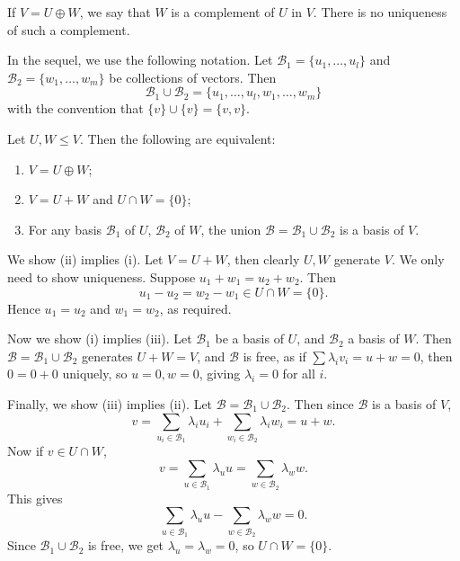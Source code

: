 \documentclass[12pt]{article}
\begin{document}
\begin{remark}
	If $V = U \oplus W$, we say that $W$ is a complement of $U$ in $V$. There is no uniqueness of such a complement.
\end{remark}

In the sequel, we use the following notation. Let $\mathcal{B}_1 = \{u_1, \ldots, u_l\}$ and $\mathcal{B}_2 = \{w_1, \ldots, w_m\}$ be collections of vectors. Then
\[
	\mathcal{B}_1 \cup \mathcal{B}_2 = \{u_1, \ldots, u_l, w_1, \ldots, w_m\}
\]
with the convention that $\{v\} \cup \{v\} = \{v, v\}$.

\begin{lemma}
	Let $U, W \leq V$. Then the following are equivalent:
	\begin{enumerate}[\normalfont(i)]
		\item $V = U \oplus W$;
		\item $V = U + W$ and $U \cap W = \{0\}$;
		\item For any basis $\mathcal{B}_1$ of $U$, $\mathcal{B}_2$ of $W$, the union $\mathcal{B} = \mathcal{B}_1 \cup \mathcal{B}_2$ is a basis of $V$.
	\end{enumerate}
\end{lemma}

\begin{proofbox}
	We show (ii) implies (i). Let $V = U + W$, then clearly $U, W$ generate $V$. We only need to show uniqueness. Suppose $u_1 + w_1 = u_2 + w_2$. Then
	\[
		u_1 - u_2 = w_2 - w_1 \in U \cap W = \{0\}
	.\]
	Hence $u_1 = u_2$ and $w_1 = w_2$, as required.

	Now we show (i) implies (iii). Let $\mathcal{B}_1$ be a basis of $U$, and $\mathcal{B}_2$ a basis of $W$. Then $\mathcal{B} = \mathcal{B}_1 \cup \mathcal{B}_2$ generates $U + W = V$, and $\mathcal{B}$ is free, as if $\sum \lambda_i v_i = u + w = 0$, then $0 = 0 + 0$ uniquely, so $u = 0, w = 0$, giving $\lambda_i = 0$ for all $i$.

	Finally, we show (iii) implies (ii). Let $\mathcal{B} = \mathcal{B}_1 \cup \mathcal{B}_2$. Then since $\mathcal{B}$ is a basis of $V$,
	\[
	v = \sum_{u_i \in \mathcal{B}_1}\lambda_i u_i + \sum_{w_i \in \mathcal{B}_2}\lambda_i w_i = u + w
	.\]
	Now if $v \in U \cap W$,
	\[
	v = \sum_{u \in \mathcal{B}_1} \lambda_u u = \sum_{w \in \mathcal{B}_2} \lambda_w w
	.\]
	This gives
	\[
	\sum_{u \in \mathcal{B}_1}\lambda_u u - \sum_{w \in \mathcal{B}_2} \lambda_w w = 0
	.\]
	Since $\mathcal{B}_1 \cup \mathcal{B}_2$ is free, we get $\lambda_u = \lambda_w = 0$, so $U \cap W = \{0\}$.
\end{proofbox}
\end{document}
